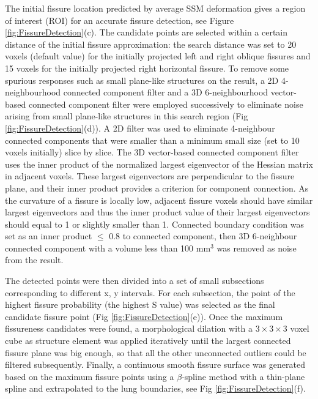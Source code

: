 \documentclass[]{spie}  %
\begin{document}
{The initial fissure location predicted by average SSM deformation gives a region of interest (ROI) for an accurate fissure detection, see Figure \ref{fig:FissureDetection}(c). The candidate points are selected within a certain distance of the initial fissure approximation: the search distance was set to 20 voxels (default value) for the initially projected left and right oblique fissures and 15 voxels for the initially projected right horizontal fissure. To remove some spurious responses such as small plane-like structures on the result, a 2D 4-neighbourhood connected component filter and a 3D 6-neighbourhood vector-based connected component filter were employed successively to eliminate noise arising from small plane-like structures in this search region (Fig \ref{fig:FissureDetection}(d)). A 2D filter was used to eliminate 4-neighbour connected components that were smaller than a minimum small size (set to 10 voxels initially) slice by slice. The 3D vector-based connected component filter uses the inner product of the normalized largest eigenvector of the Hessian matrix in adjacent voxels. These largest eigenvectors are perpendicular to the fissure plane, and their inner product provides a criterion for component connection. As the curvature of a fissure is locally low, adjacent fissure voxels should have similar largest eigenvectors and thus the inner product value of their largest eigenvectors should equal to 1 or slightly smaller than 1. Connected boundary condition was set as an inner product $\leq$ 0.8 to connected component, then 3D 6-neighbour connected component with a volume less than 100 $\mathrm{mm^3}$ was removed as noise from the result.

The detected points were then divided into a set of small subsections corresponding to different x, y intervals. For each subsection, the point of the highest fissure probability (the highest S value) was selected as the final candidate fissure point (Fig \ref{fig:FissureDetection}(e)). Once the maximum fissureness candidates were found, a morphological dilation with a $3\times3\times3$ voxel cube as structure element was applied iteratively until the largest connected fissure plane was big enough, so that all the other unconnected outliers could be filtered subsequently. Finally, a continuous smooth fissure surface was generated based on the maximum fissure points using a $\beta$-spline method with a thin-plane spline \cite{lee1997scattered} and extrapolated to the lung boundaries, see Fig \ref{fig:FissureDetection}(f).

}
\end{document}
